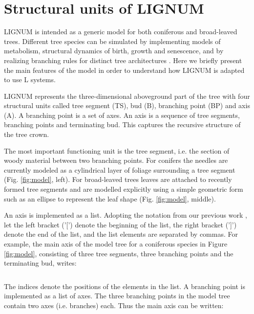 \section{Structural units  of LIGNUM} 

LIGNUM  is intended   as a  generic   model  for  both coniferous  and
broad-leaved trees.  Different   tree   species can be   simulated  by
implementing  models  of  metabolism,  structural  dynamics of  birth,
growth and senescence, and by  realizing branching rules for  distinct
tree   architectures   \citep{perttunen:96,  perttunen:01}.   Here  we
briefly present the main features of the model  in order to understand
how LIGNUM is adapted to use L systems.

LIGNUM represents  the three-dimensional aboveground part  of the tree
with  four  structural  units  called  tree  segment  (TS),  bud  (B),
branching point  (BP) and  axis (A).   A branching point  is a  set of
axes. An  axis is  a sequence of  tree segments, branching  points and
terminating bud.   This captures the  recursive structure of  the tree
crown.

The most  important functioning  unit is the  tree segment,  i.e.  the
section of woody material  between two branching points.  For conifers
the needles  are currently modeled  as a cylindrical layer  of foliage
surrounding  a  tree   segment  (Fig.   \ref{fig:model},  left).   For
broad-leaved  trees  leaves  are  attached  to  recently  formed  tree
segments  and are modelled  explicitly using  a simple  geometric form
such as an ellipse to  represent the leaf shape (Fig. \ref{fig:model},
middle).

An  axis is implemented  as a  list.  Adopting  the notation  from our
previous work \citet{perttunen:96}, let  the left bracket ('[') denote
the beginning of  the list, the right bracket (']')  denote the end of
the list, and the list  elements are separated by commas. For example,
the main  axis of the  model tree for  a coniferous species  in Figure
\ref{fig:model},  consisting of three  tree segments,  three branching
points and the terminating bud, writes:

\begin{equation}
[TS_0,BP_1,TS_2,BP_3,TS_4,BP_5,B_6]
\end{equation}

The  indices denote  the positions  of the  elements in  the  list.  A
branching point is implemented as a list of axes.  The three branching
points in the model tree  contain two axes (i.e.  branches) each. Thus
the main axis can be written:

